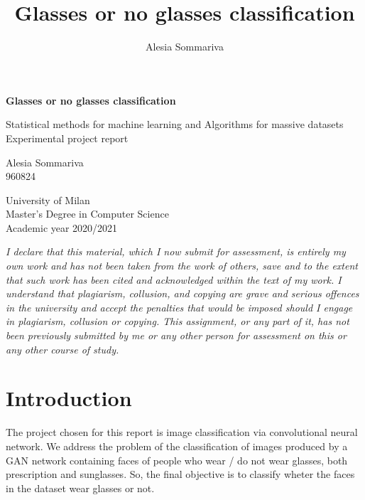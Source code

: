 \documentclass{article}
\begin{document}
\title{Glasses or no glasses classification}
\author{Alesia Sommariva}

\begin{titlepage}
    \begin{center}
        \vspace*{2cm}

        \Large
        \textbf{Glasses or no glasses classification}
        \vspace{0.5cm}
        
        \large
        Statistical methods for machine learning and Algorithms for massive datasets\\ 
        Experimental project report
        \vspace{1.5cm}
        
        Alesia Sommariva\\
        \small
        960824
        \vspace{.5cm}
        
        \normalsize             
        University of Milan\\
        Master's Degree in Computer Science\\
        Academic year 2020/2021
        
        \vfill
        \emph{I declare that this material, which I now submit for assessment, 
        is entirely my own work and has not been taken from the work of others, 
        save and to the extent that such work has been cited and acknowledged within 
        the text of my work. I understand that plagiarism, collusion, and copying 
        are grave and serious offences in the university and accept the penalties that 
        would be imposed should I engage in plagiarism, collusion or copying. 
        This assignment, or any part of it, has not been previously submitted by 
        me or any other person for assessment on this or any other course of study.}

\setlength{\parskip}{0.7em}
    \end{center}
\end{titlepage}


\tableofcontents

\newpage

\section{Introduction}
The project chosen for this report is image classification via convolutional neural network. We address the problem of the classification of images produced by a GAN network containing faces of people who wear / do not wear glasses, both prescription and sunglasses. So, the final objective is to classify wheter the faces in the dataset wear glasses or not.
\end{document}
